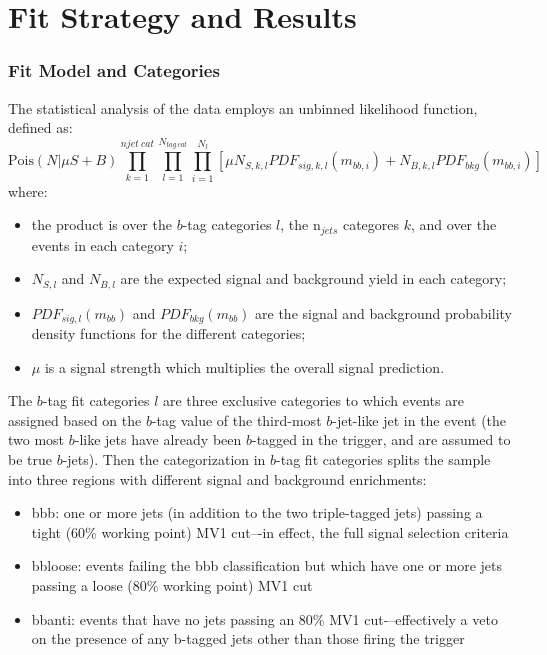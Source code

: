  

\chapter[Fit Strategy and Results]{Fit Strategy and Results}

\subsection{Fit Model and Categories}
\label{subsec:fitmodel}

The statistical analysis of the data employs an unbinned likelihood
function, defined as:
\begin{equation}
\text{Pois}(N|\mu S+B) \prod_{k=1}^{njet\ cat} \prod_{l=1}^{N_{tag\ cat}} \prod_{i=1}^{N_{l}} \left[ \mu N_{S,k,l} PDF_{sig,k,l}(m_{bb,i}) + N_{B,k,l} PDF_{bkg}(m_{bb,i}) \right]
\end{equation}
where:
\begin{itemize}
\item the product is over the $b$-tag categories $l$, the n$_{jets}$ categores $k$, and over the events in each category $i$;
\item $N_{S,l}$ and $N_{B,l}$ are the expected signal and background yield in each category;
\item $PDF_{sig,l}(m_{bb})$ and $PDF_{bkg}(m_{bb})$ are the signal and background probability density functions for  the different categories;
\item $\mu$ is a signal strength which multiplies the overall signal prediction.
\end{itemize}


The $b$-tag fit categories $l$ are three exclusive categories to which events are assigned
based on the $b$-tag value of the third-most $b$-jet-like jet in the event (the two most
$b$-like jets have already been $b$-tagged in the trigger, and are assumed to be true
$b$-jets).  Then the categorization in $b$-tag fit categories splits the sample into three
regions with different signal and background enrichments:


\begin{itemize}
    \item bbb: one or more jets (in addition to the two triple-tagged jets) passing a tight (60\% working point)
 MV1 cut–-in effect, the full signal selection criteria
    \item bbloose: events failing the bbb classification but which have one or more jets passing a loose (80\%
working point) MV1 cut
    \item bbanti: events that have no jets passing an 80\% MV1 cut-–effectively a veto on the presence of any
b-tagged jets other than those firing the trigger
\end{itemize}

